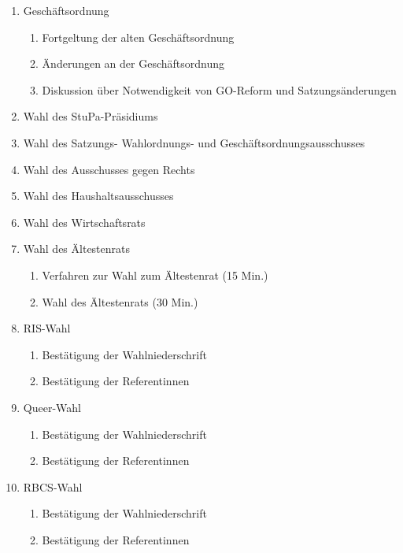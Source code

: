 \documentclass[ngerman,headheight=70pt]{scrartcl}
\begin{document}
    \begin{enumerate}[label={\textbf{Top \theenumi}},leftmargin=*]
        \item Geschäftsordnung
            \begin{enumerate}
                \item Fortgeltung der alten Geschäftsordnung
                \item Änderungen an der Geschäftsordnung
                \item Diskussion über Notwendigkeit von GO-Reform und Satzungsänderungen
            \end{enumerate}
        \item Wahl des StuPa-Präsidiums
        \item Wahl des Satzungs- Wahlordnungs- und  Geschäftsordnungsausschusses
        \item Wahl des Ausschusses gegen Rechts
        \item Wahl des Haushaltsausschusses
        \item Wahl des Wirtschaftsrats
        \item Wahl des Ältestenrats
            \begin{enumerate}
                \item Verfahren zur Wahl zum Ältestenrat (15 Min.)
                \item Wahl des Ältestenrats (30 Min.)
            \end{enumerate}
        \item RIS-Wahl
            \begin{enumerate}
                \item Bestätigung der Wahlniederschrift
                \item Bestätigung der Referentinnen
            \end{enumerate}
        \item Queer-Wahl
            \begin{enumerate}
                \item Bestätigung der Wahlniederschrift
                \item Bestätigung der Referentinnen
            \end{enumerate}
        \item RBCS-Wahl
            \begin{enumerate}
                \item Bestätigung der Wahlniederschrift
                \item Bestätigung der Referentinnen

\end{enumerate}
\end{enumerate}
\end{document}
